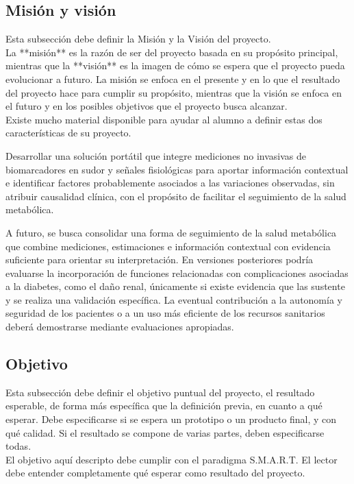 \subsection{Misión y visión}
{\consigna
Esta subsección debe definir la Misión y la Visión del proyecto.\\
La **misión** es la razón de ser del proyecto basada en su propósito principal, mientras que la **visión** es la imagen de cómo se espera que el proyecto pueda evolucionar a futuro. La misión se enfoca en el presente y en lo que el resultado del proyecto hace para cumplir su propósito, mientras que la visión se enfoca en el futuro y en los posibles objetivos que el proyecto busca alcanzar.\\
Existe mucho material disponible para ayudar al alumno a definir estas dos características de su proyecto.
}

Desarrollar una solución portátil que integre mediciones no invasivas de biomarcadores en sudor y señales fisiológicas para aportar información contextual e identificar factores probablemente asociados a las variaciones observadas, sin atribuir causalidad clínica, con el propósito de facilitar el seguimiento de la salud metabólica.

A futuro, se busca consolidar una forma de seguimiento de la salud metabólica que combine mediciones, estimaciones e información contextual con evidencia suficiente para orientar su interpretación. En versiones posteriores podría evaluarse la incorporación de funciones relacionadas con complicaciones asociadas a la diabetes, como el daño renal, únicamente si existe evidencia que las sustente y se realiza una validación específica. La eventual contribución a la autonomía y seguridad de los pacientes o a un uso más eficiente de los recursos sanitarios deberá demostrarse mediante evaluaciones apropiadas.


\subsection{Objetivo}
{\consigna
Esta subsección debe definir el objetivo puntual del proyecto, el resultado esperable, de forma más específica que la definición previa, en cuanto a qué esperar. Debe especificarse si se espera un prototipo o un producto final, y con qué calidad. Si el resultado se compone de varias partes, deben especificarse todas.\\
El objetivo aquí descripto debe cumplir con el paradigma S.M.A.R.T. El lector debe entender completamente qué esperar como resultado del proyecto.
}

